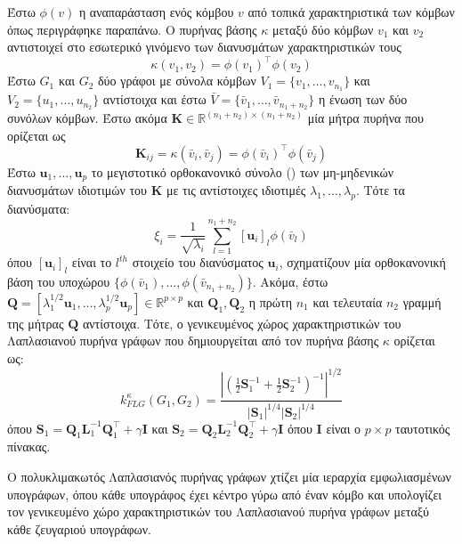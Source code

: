 Έστω $\phi(v)$ η αναπαράσταση ενός κόμβου $v$ από τοπικά χαρακτηριστικά των κόμβων όπως περιγράφηκε παραπάνω.
Ο πυρήνας βάσης $\kappa$ μεταξύ δύο κόμβων $v_1$ και $v_2$ αντιστοιχεί στο εσωτερικό γινόμενο των διανυσμάτων χαρακτηριστικών τους
\begin{equation}
    \kappa(v_1, v_2) = \phi(v_1)^\top \phi(v_2) 
\end{equation}
Έστω $G_1$ και $G_2$ δύο γράφοι με σύνολα κόμβων $V_1 = \{ v_1, \ldots, v_{n_1}\}$ και $V_2 = \{ u_1, \ldots, u_{n_2} \}$ αντίστοιχα και έστω $\bar{V} = \{ \bar{v}_1, \ldots, \bar{v}_{n_1+n_2} \}$ η ένωση των δύο συνόλων κόμβων.
Έστω ακόμα $\mathbf{K} \in \mathbb{R}^{(n_1+n_2) \times (n_1+n_2)}$ μία μήτρα πυρήνα που ορίζεται ως
\begin{equation}
    \mathbf{K}_{ij} = \kappa(\bar{v}_i, \bar{v}_j) = \phi(\bar{v}_i)^\top \phi(\bar{v}_j)
\end{equation}
Έστω $\mathbf{u}_1, \ldots, \mathbf{u}_p$ το μεγιστοτικό ορθοκανονικό σύνολο () των μη-μηδενικών διανυσμάτων ιδιοτιμών του $\mathbf{K}$
με τις αντίστοιχες ιδιοτιμές $\lambda_1, \ldots, \lambda_p$.
Τότε τα διανύσματα:
\begin{equation}
    \xi_i = \frac{1}{\sqrt{\lambda_i}} \sum_{l=1}^{n_1+n_2} [\mathbf{u}_i]_l \phi(\bar{v}_l)
\end{equation}
όπου $[\mathbf{u}_i]_l$ είναι το $l^{th}$ στοιχείο του διανύσματος $\mathbf{u}_i$, σχηματίζουν μία ορθοκανονική βάση του υποχώρου $\{ \phi(\bar{v}_1), \ldots, \phi(\bar{v}_{n_1+n_2}) \}$.
Ακόμα, έστω $\mathbf{Q} = [ \lambda_1^{1/2} \mathbf{u}_1, \ldots,\lambda_p^{1/2} \mathbf{u}_p ] \in \mathbb{R}^{p \times p}$ και $\mathbf{Q}_1, \mathbf{Q}_2$ η πρώτη $n_1$ και τελευταία $n_2 $ γραμμή της μήτρας $\mathbf{Q}$ αντίστοιχα.
Τότε, ο γενικευμένος χώρος χαρακτηριστικών του Λαπλασιανού πυρήνα γράφων που δημιουργείται από τον πυρήνα βάσης $\kappa$ ορίζεται ως:
\begin{equation}
    k_{FLG}^\kappa(G_1, G_2) = \frac{| (\frac{1}{2} \mathbf{S}_1^{-1} + \frac{1}{2} \mathbf{S}_2^{-1} )^{-1} |^{1/2}}{|\mathbf{S}_1|^{1/4} |\mathbf{S}_2|^{1/4}} 
\end{equation}
όπου $\mathbf{S}_1 = \mathbf{Q}_1 \mathbf{L}_1^{-1} \mathbf{Q}_1^\top + \gamma \mathbf{I}$ και $\mathbf{S}_2 = \mathbf{Q}_2 \mathbf{L}_2^{-1} \mathbf{Q}_2^\top + \gamma \mathbf{I}$ όπου $\mathbf{I}$ είναι ο $p \times p$ ταυτοτικός πίνακας.\par
Ο πολυκλιμακωτός Λαπλασιανός πυρήνας γράφων χτίζει μία ιεραρχία εμφωλιασμένων υπογράφων, όπου κάθε υπογράφος έχει κέντρο γύρω από έναν κόμβο και υπολογίζει τον γενικευμένο χώρο χαρακτηριστικών του Λαπλασιανού πυρήνα γράφων μεταξύ κάθε ζευγαριού υπογράφων.
